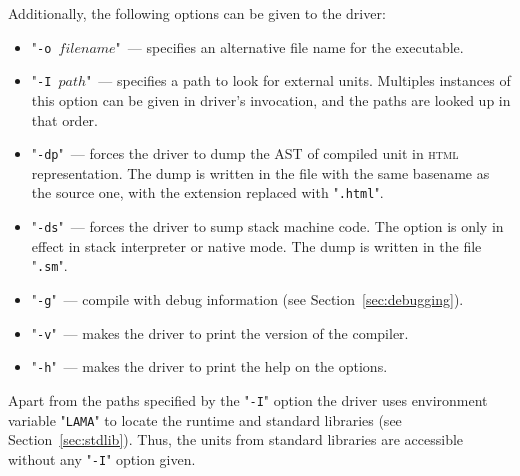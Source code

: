 Additionally, the following options can be given to the driver:

\begin{itemize}
\item "\texttt{-o $filename$}"~--- specifies an alternative file name for the executable. 
\item "\texttt{-I $path$}"~--- specifies a path to look for external units. Multiples instances of this option can be given in driver's
  invocation, and the paths are looked up in that order.
\item "\texttt{-dp}"~--- forces the driver to dump the AST of compiled unit in \textsc{html} representation. The dump is written in the file with the same
  basename as the source one, with the extension replaced with "\texttt{.html}".
\item "\texttt{-ds}"~--- forces the driver to sump stack machine code. The option is only in effect in stack interpreter or
  native mode. The dump is written in the file "\texttt{.sm}".
\item "\texttt{-g}"~--- compile with debug information (see Section~\ref{sec:debugging}).
\item "\texttt{-v}"~--- makes the driver to print the version of the compiler.
\item "\texttt{-h}"~--- makes the driver to print the help on the options.
\end{itemize}

Apart from the paths specified by the "\texttt{-I}" option the driver uses environment variable "\texttt{LAMA}"
to locate the runtime and standard libraries (see Section~\ref{sec:stdlib}). Thus, the units from standard libraries are accessible
without any "\texttt{-I}" option given.
